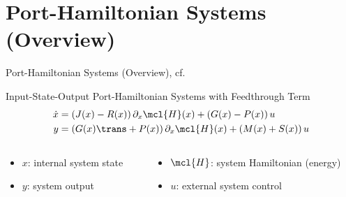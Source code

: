 \section{Port-Hamiltonian Systems (Overview)}

\begin{frame}{Port-Hamiltonian Systems (Overview), cf.~\cite{VanDerSchaft2014}}
    \begin{block}{Input-State-Output Port-Hamiltonian Systems with Feedthrough Term}
        \begin{align*}
            \dot{x} &= \left( J(x) - R(x) \right) \partial_x \mcl{H}(x) + \left( G(x) - P(x) \right) u \\
            y &= \left( G(x)\trans + P(x) \right) \partial_x \mcl{H}(x) + \left( M(x) + S(x) \right) u
        \end{align*}
    \end{block}

    \begin{columns}
        \begin{column}{.41\textwidth}
            \begin{itemize}
                \item $x$: internal system state
                \item $y$: system output
            \end{itemize}
        \end{column}
        \begin{column}{.41\textwidth}
            \begin{itemize}
                \item $\mcl{H}$: system Hamiltonian (energy)
                \item $u$: external system control
            \end{itemize}
        \end{column}
    \end{columns}


\end{frame}
